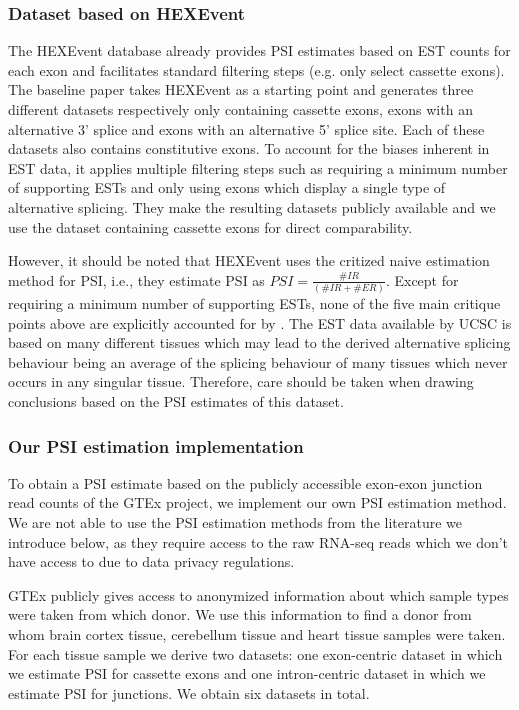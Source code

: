 \subsubsection{Dataset based on HEXEvent}
The HEXEvent database already provides PSI estimates based on EST counts for each exon and facilitates standard filtering steps (e.g. only select cassette exons). 
The baseline paper \cite{dsc} takes HEXEvent as a starting point and generates three different datasets respectively only containing cassette exons, exons with an alternative 3' splice and exons with an alternative 5' splice site. Each of these datasets also contains constitutive exons. To account for the biases inherent in EST data, it applies multiple filtering steps such as requiring a minimum number of supporting ESTs and only using exons which display a single type of alternative splicing. They make the resulting datasets publicly available and we use the dataset containing cassette exons for direct comparability. 

However, it should be noted that HEXEvent uses the critized naive estimation method for PSI, i.e., they estimate PSI as $PSI = \frac{\#IR}{(\#IR+\#ER)}$. Except for requiring a minimum number of supporting ESTs, none of the five main critique points above are explicitly accounted for by \cite{dsc}. The EST data available by UCSC is based on many different tissues which may lead to the derived alternative splicing behaviour being an average of the splicing behaviour of many tissues which never occurs in any singular tissue. %
Therefore, care should be taken when drawing conclusions based on the PSI estimates of this dataset. 

\subsubsection{Our PSI estimation implementation} \label{subsubsec:implementedpsiestimation}
To obtain a PSI estimate based on the publicly accessible exon-exon junction read counts of the GTEx project, we implement our own PSI estimation method. We are not able to use the PSI estimation methods from the literature we introduce below, as they require access to the raw RNA-seq reads which we don't have access to due to data privacy regulations.

GTEx publicly gives access to anonymized information about which sample types were taken from which donor. We use this information to find a donor from whom brain cortex tissue, cerebellum tissue and heart tissue samples were taken. For each tissue sample we derive two datasets: one exon-centric dataset in which we estimate PSI for cassette exons and one intron-centric dataset in which we estimate PSI for junctions. 
We obtain six datasets in total.

